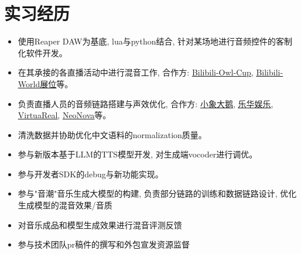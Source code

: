 \documentclass{resume}
\begin{document}

\section{实习经历}
\begin{itemize}
  \item 使用Reaper DAW为基底, lua与python结合, 针对某场地进行音频控件的客制化软件开发。
  \item 在其承接的各直播活动中进行混音工作, 合作方: \href{https://www.bilibili.com/video/BV1Tu411p7mL/?spm_id_from=333.337.search-card.all.click&vd_source=4a2102b1492a02f24d5aab2ce3961279}{\uline{Bilibili-Owl-Cup}}, \href{https://space.bilibili.com/1178470738/dynamic}{\uline{Bilibili-World展位}}等。
  \item 负责直播人员的音频链路搭建与声效优化, 合作方: \href{https://www.zhipin.com/gongsi/827bf70c5bf4e3861XV_39q5FFU~.html}{\uline{小象大鹅}}, \href{https://space.bilibili.com/2018113152}{\uline{乐华娱乐}}, \href{https://space.bilibili.com/413748120}{\uline{VirtuaReal}}, \href{https://space.bilibili.com/3494368205867483}{\uline{NeoNova}}等。
\end{itemize}

\begin{itemize}
  \item 清洗数据并协助优化中文语料的normalization质量。
  \item 参与新版本基于LLM的TTS模型开发, 对生成端vocoder进行调优。
  \item 参与开发者SDK的debug与新功能实现。
\end{itemize}

\begin{itemize}
  \item 参与"音潮"音乐生成大模型的构建, 负责部分链路的训练和数据链路设计, 优化生成模型的混音效果/音质
  \item 对音乐成品和模型生成效果进行混音评测反馈
  \item 参与技术团队pr稿件的撰写和外包宣发资源监督
\end{itemize}
\end{document}
